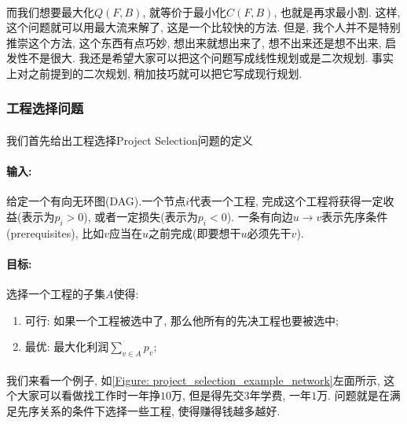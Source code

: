         \paragraph{}而我们想要最大化$Q(F,B)$, 就等价于最小化$C(F,B)$, 也就是再求最小割. 这样, 这个问题就可以用最大流来解了, 这是一个比较快的方法. 但是, 我个人并不是特别推崇这个方法, 这个东西有点巧妙, 想出来就想出来了, 想不出来还是想不出来, 启发性不是很大. 我还是希望大家可以把这个问题写成线性规划或是二次规划. 事实上对之前提到的二次规划, 稍加技巧就可以把它写成现行规划.

        \subsubsection{工程选择问题}
            \paragraph{}我们首先给出工程选择{\sc Project Selection}问题的定义
            \paragraph{输入:}给定一个有向无环图(DAG).一个节点$i$代表一个工程, 完成这个工程将获得一定收益(表示为$p_i > 0$), 或者一定损失(表示为$p_i < 0$). 一条有向边$u \rightarrow v$表示先序条件(prerequisites), 比如$v$应当在$u$之前完成(即要想干$u$必须先干$v$). 
\paragraph{目标:}选择一个工程的子集$A$使得:
 \begin{enumerate}
    \item 可行: 如果一个工程被选中了, 那么他所有的先决工程也要被选中;
    \item 最优: 最大化利润$\sum_{ v \in A} p_v$;
\end{enumerate}

            \paragraph{}我们来看一个例子, 如\figurename\ref{Figure: project_selection_example_network}左面所示, 这个大家可以看做找工作时一年挣$10$万, 但是得先交$3$年学费, 一年$1$万. 问题就是在满足先序关系的条件下选择一些工程, 使得赚得钱越多越好.
